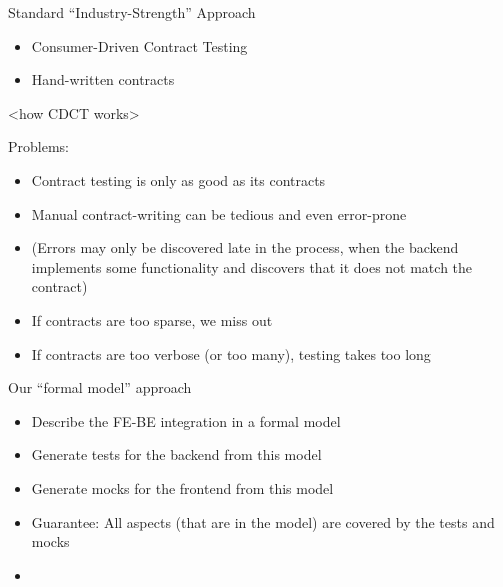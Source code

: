 \begin{frame}[fragile]{Standard ``Industry-Strength'' Approach}


\begin{itemize}
\item Consumer-Driven Contract Testing
\item Hand-written contracts
\end{itemize}

<how CDCT works>

Problems:

\begin{itemize}
\item Contract testing is only as good as its contracts
\item Manual contract-writing can be tedious and even error-prone
\item (Errors may only be discovered late in the process, when the backend implements some functionality and discovers that it does not match the contract)
\item If contracts are too sparse, we miss out
\item If contracts are too verbose (or too many), testing takes too long
\end{itemize}

\end{frame}

\begin{frame}[fragile]{Our ``formal model'' approach}

\begin{itemize}
\item Describe the FE-BE integration in a formal model
\item Generate tests for the backend from this model
\item Generate mocks for the frontend from this model
\item Guarantee: All aspects (that are in the model) are covered by the tests and mocks
\end{itemize}

\end{frame}

\begin{frame}[fragile]{}

\begin{itemize}
\item
\end{itemize}

\end{frame}

